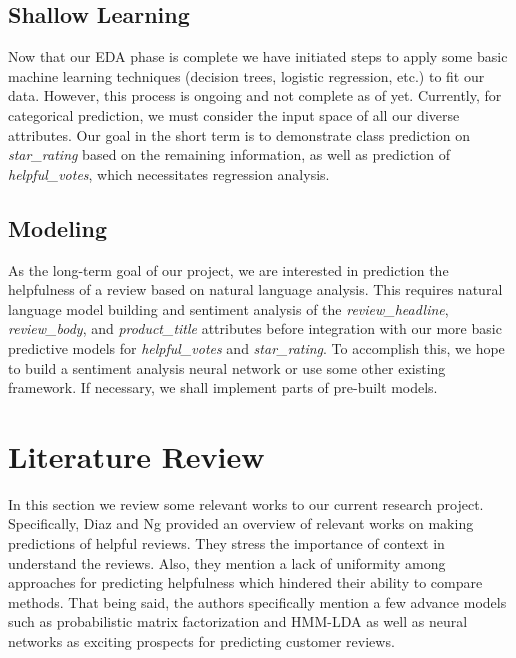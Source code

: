 \documentclass[10pt, conference, compsocconf]{IEEEtran}
\begin{document}
\subsection{Shallow Learning}

Now that our EDA phase is complete we have initiated steps to apply some basic machine learning techniques (decision trees, logistic regression, etc.) to fit our data. However, this process is ongoing and not complete as of yet. Currently, for categorical prediction, we must consider the input space of all our diverse attributes. Our goal in the short term is to demonstrate class prediction on \textit{star\_rating} based on the remaining information, as well as prediction of \textit{helpful\_votes}, which necessitates regression analysis.

\subsection{Modeling}

As the long-term goal of our project, we are interested in prediction the helpfulness of a review based on natural language analysis. This requires natural language model building and sentiment analysis of the \textit{review\_headline}, \textit{review\_body}, and \textit{product\_title} attributes before integration with our more basic predictive models for \textit{helpful\_votes} and \textit{star\_rating}. To accomplish this, we hope to build a sentiment analysis neural network or use some other existing framework. If necessary, we shall implement parts of pre-built models.

\section{Literature Review}

In this section we review some relevant works to our current research project. Specifically, Diaz and Ng \cite{ocampo} provided an overview of relevant works on making predictions of helpful reviews. They stress the importance of context in understand the reviews. Also, they mention a lack of uniformity among approaches for predicting helpfulness which hindered their ability to compare methods. That being said, the authors specifically mention a few advance models such as probabilistic matrix factorization and HMM-LDA as well as neural networks as exciting prospects for predicting customer reviews.
\end{document}

